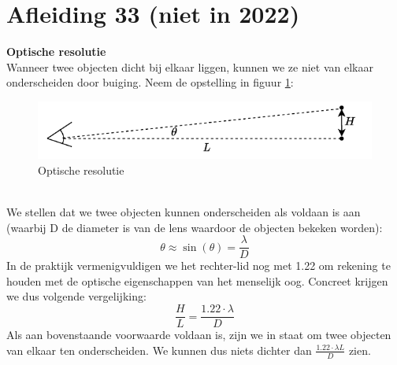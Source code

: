 \documentclass[a4paper,kul]{kulakarticle} %
\begin{document}
\section{Afleiding 33 (niet in 2022)}
\textbf{Optische resolutie} \\
Wanneer twee objecten dicht bij elkaar liggen, kunnen we ze niet van elkaar onderscheiden door buiging. Neem de opstelling in figuur \ref{fig:optischeresolutie}:
\begin{figure}[h]
	\centering
	\includegraphics[width=0.7\linewidth]{OptischeResolutie}
	\caption[Optische resolutie]{Optische resolutie}
	\label{fig:optischeresolutie}
\end{figure}\\
We stellen dat we twee objecten kunnen onderscheiden als voldaan is aan (waarbij D de diameter is van de lens waardoor de objecten bekeken worden):
\begin{equation*}
	\theta\approx\sin(\theta)=\frac{\lambda}{D}
\end{equation*}
In de praktijk vermenigvuldigen we het rechter-lid nog met \num{1.22} om rekening te houden met de optische eigenschappen van het menselijk oog. Concreet krijgen we dus volgende vergelijking:
\begin{equation*}
	\frac{H}{L}= \frac{1.22\cdot \lambda}{D}
\end{equation*}
Als aan bovenstaande voorwaarde voldaan is, zijn we in staat om twee objecten van elkaar ten onderscheiden. We kunnen dus niets dichter dan $\frac{1.22\cdot\lambda L}{D}$ zien. 
\end{document}
